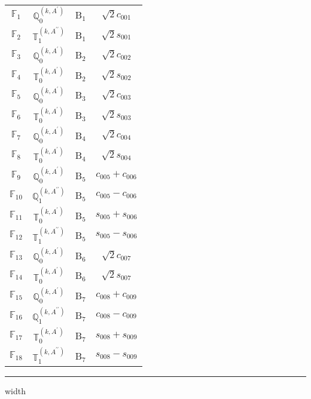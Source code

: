 \documentclass[fleqn,10pt,landscape]{article}
\begin{document}
\begin{itemize}
\begin{center}
\begin{longtable}{c|c|c|c}
$ \mathbb{F}_{1} $ & $\mathbb{Q}_{0}^{(k,A^{\prime})}$ & B$_{1}$ & $\sqrt{2} c_{001}$ \\
$ \mathbb{F}_{2} $ & $\mathbb{T}_{1}^{(k,A^{\prime\prime})}$ & B$_{1}$ & $\sqrt{2} s_{001}$ \\ \hline
$ \mathbb{F}_{3} $ & $\mathbb{Q}_{0}^{(k,A^{\prime})}$ & B$_{2}$ & $\sqrt{2} c_{002}$ \\
$ \mathbb{F}_{4} $ & $\mathbb{T}_{0}^{(k,A^{\prime})}$ & B$_{2}$ & $\sqrt{2} s_{002}$ \\ \hline
$ \mathbb{F}_{5} $ & $\mathbb{Q}_{0}^{(k,A^{\prime})}$ & B$_{3}$ & $\sqrt{2} c_{003}$ \\
$ \mathbb{F}_{6} $ & $\mathbb{T}_{0}^{(k,A^{\prime})}$ & B$_{3}$ & $\sqrt{2} s_{003}$ \\ \hline
$ \mathbb{F}_{7} $ & $\mathbb{Q}_{0}^{(k,A^{\prime})}$ & B$_{4}$ & $\sqrt{2} c_{004}$ \\
$ \mathbb{F}_{8} $ & $\mathbb{T}_{0}^{(k,A^{\prime})}$ & B$_{4}$ & $\sqrt{2} s_{004}$ \\ \hline
$ \mathbb{F}_{9} $ & $\mathbb{Q}_{0}^{(k,A^{\prime})}$ & B$_{5}$ & $c_{005} + c_{006}$ \\
$ \mathbb{F}_{10} $ & $\mathbb{Q}_{1}^{(k,A^{\prime\prime})}$ & B$_{5}$ & $c_{005} - c_{006}$ \\
$ \mathbb{F}_{11} $ & $\mathbb{T}_{0}^{(k,A^{\prime})}$ & B$_{5}$ & $s_{005} + s_{006}$ \\
$ \mathbb{F}_{12} $ & $\mathbb{T}_{1}^{(k,A^{\prime\prime})}$ & B$_{5}$ & $s_{005} - s_{006}$ \\ \hline
$ \mathbb{F}_{13} $ & $\mathbb{Q}_{0}^{(k,A^{\prime})}$ & B$_{6}$ & $\sqrt{2} c_{007}$ \\
$ \mathbb{F}_{14} $ & $\mathbb{T}_{0}^{(k,A^{\prime})}$ & B$_{6}$ & $\sqrt{2} s_{007}$ \\ \hline
$ \mathbb{F}_{15} $ & $\mathbb{Q}_{0}^{(k,A^{\prime})}$ & B$_{7}$ & $c_{008} + c_{009}$ \\
$ \mathbb{F}_{16} $ & $\mathbb{Q}_{1}^{(k,A^{\prime\prime})}$ & B$_{7}$ & $c_{008} - c_{009}$ \\
$ \mathbb{F}_{17} $ & $\mathbb{T}_{0}^{(k,A^{\prime})}$ & B$_{7}$ & $s_{008} + s_{009}$ \\
$ \mathbb{F}_{18} $ & $\mathbb{T}_{1}^{(k,A^{\prime\prime})}$ & B$_{7}$ & $s_{008} - s_{009}$ \\
\end{longtable}
\end{center}

 \hfil \hrule height 1mm width \textwidth \hfil


\end{itemize}
\end{document}
